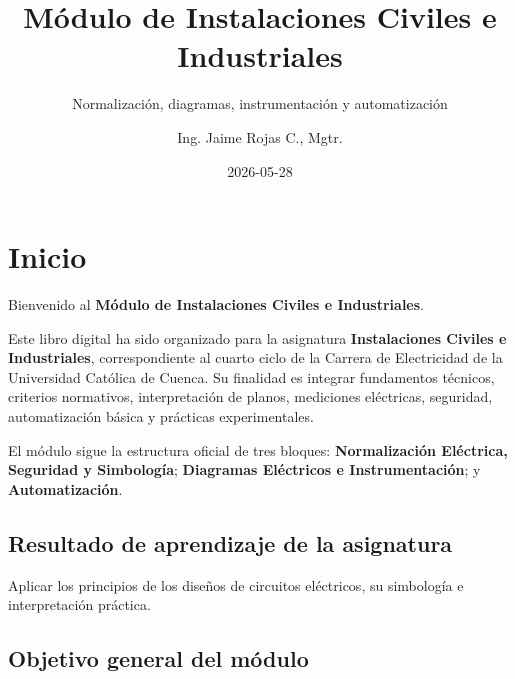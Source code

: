 \documentclass[
  spanish,
  letterpaper,
  DIV=11,
  numbers=noendperiod]{scrreprt}
\title{Módulo de Instalaciones Civiles e Industriales}
\subtitle{Normalización, diagramas, instrumentación y automatización}
\author{Ing. Jaime Rojas C., Mgtr.}
\date{2026-05-28}
\renewcommand*\contentsname{Tabla de contenidos}
\newcommand\contentsname{Tabla de contenidos}
\begin{document}
\maketitle

\renewcommand*\contentsname{Tabla de contenidos}
{
\setcounter{tocdepth}{2}
\tableofcontents
}


\chapter{Inicio}\label{inicio}

Bienvenido al \textbf{Módulo de Instalaciones Civiles e Industriales}.

Este libro digital ha sido organizado para la asignatura
\textbf{Instalaciones Civiles e Industriales}, correspondiente al cuarto
ciclo de la Carrera de Electricidad de la Universidad Católica de
Cuenca. Su finalidad es integrar fundamentos técnicos, criterios
normativos, interpretación de planos, mediciones eléctricas, seguridad,
automatización básica y prácticas experimentales.

\begin{tcolorbox}[enhanced jigsaw, arc=.35mm, bottomrule=.15mm, bottomtitle=1mm, breakable, colback=white, colbacktitle=quarto-callout-note-color!10!white, colframe=quarto-callout-note-color-frame, coltitle=black, left=2mm, leftrule=.75mm, opacityback=0, opacitybacktitle=0.6, rightrule=.15mm, title=\textcolor{quarto-callout-note-color}{\faInfo}\hspace{0.5em}{Enfoque del módulo}, titlerule=0mm, toprule=.15mm, toptitle=1mm]

El módulo sigue la estructura oficial de tres bloques:
\textbf{Normalización Eléctrica, Seguridad y Simbología};
\textbf{Diagramas Eléctricos e Instrumentación}; y
\textbf{Automatización}.

\end{tcolorbox}

\section{Resultado de aprendizaje de la
asignatura}\label{resultado-de-aprendizaje-de-la-asignatura}

Aplicar los principios de los diseños de circuitos eléctricos, su
simbología e interpretación práctica.

\section{Objetivo general del
módulo}\label{objetivo-general-del-muxf3dulo}
\end{document}
